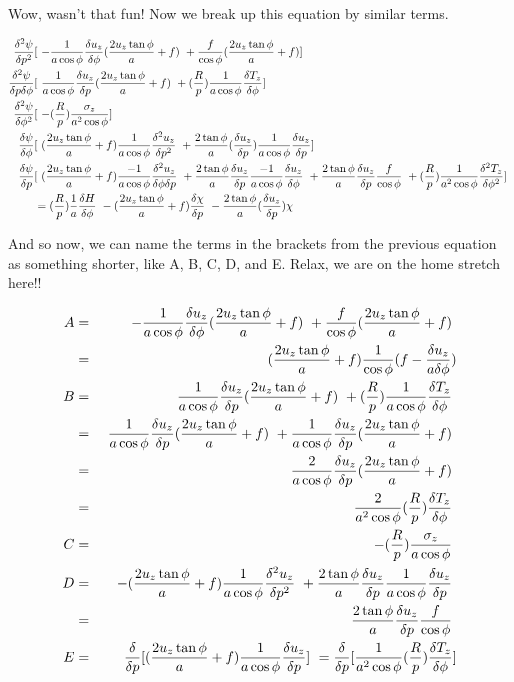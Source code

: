 \documentclass{article}
\begin{document}
Wow, wasn't that fun!  Now we break up this equation by similar terms.

\begin{eqnarray}
\frac{\delta^2 \psi}{\delta p^2} & [ \
- \frac{1}{a\cos{\phi}} \frac{\delta u_z}{\delta \phi} (\frac{2 u_z \tan \phi}{a} + f) \
+ \frac{f}{\cos \phi}(\frac{2 u_z \tan \phi}{a} + f) ] \
\nonumber\\
\frac{\delta^2 \psi}{\delta p \delta \phi} & [ \
\frac{1}{a\cos{\phi}} \frac{\delta u_z}{\delta p}  (\frac{2 u_z \tan \phi }{a} + f) \
+ (\frac{R}{p}) \frac{1}{a\cos{\phi}} \frac{\delta T_z}{\delta \phi} ] \
\nonumber\\
\frac{\delta^2 \psi}{\delta \phi^2} & [ \
- (\frac{R}{p}) \frac{\sigma_z}{a^2 \cos \phi} ] \
\nonumber\\
\frac{\delta \psi}{\delta \phi} & [ \
(\frac{2 u_z \tan \phi}{a} + f) \frac{1}{a\cos{\phi}} \frac{\delta^2 u_z}{\delta p^2} \
+ \frac{2 \tan \phi}{a} (\frac{\delta u_z}{\delta p}) \frac{1}{a\cos{\phi}} \frac{\delta u_z}{\delta p} ] \
\nonumber\\
\frac{\delta \psi}{\delta p} & [ \
(\frac{2 u_z \tan \phi}{a} + f) \frac{-1}{a \cos \phi} \frac{\delta^2 u_z}{\delta \phi \delta p} \
+ \frac{2 \tan \phi}{a} \frac{\delta u_z}{\delta p} \frac{-1}{a \cos \phi} \frac{\delta u_z}{\delta \phi} \
+ \frac{2 \tan \phi}{a} \frac{\delta u_z}{\delta p} \frac{f}{\cos \phi} \
+ (\frac{R}{p}) \frac{1}{a^2 \cos{\phi}} \frac{\delta^2 T_z}{\delta \phi^2} ] \
\nonumber\\
& = (\frac{R}{p}) \frac{1}{a} \frac{\delta H}{\delta \phi} \
- (\frac{2 u_z \tan \phi}{a} + f) \frac{\delta \chi}{\delta p} \
- \frac{2 \tan \phi}{a} (\frac{\delta u_z}{\delta p}) \chi 
\end{eqnarray}

And so now, we can name the terms in the brackets from the previous equation
as something shorter, 
like A, B, C, D, and E.  Relax, we are on the home stretch here!!

\begin{eqnarray}
A & = & \
- \frac{1}{a\cos{\phi}} \frac{\delta u_z}{\delta \phi} (\frac{2 u_z \tan \phi}{a} + f) \
+ \frac{f}{\cos \phi}(\frac{2 u_z \tan \phi}{a} + f) \
\nonumber\\
& = &(\frac{2 u_z \tan \phi}{a} + f) \frac{1}{\cos \phi} (f - \frac{\delta u_z}{a \delta \phi})
\\
B & = & \
\frac{1}{a\cos{\phi}} \frac{\delta u_z}{\delta p}  (\frac{2 u_z \tan \phi }{a} + f) \
+ (\frac{R}{p}) \frac{1}{a\cos{\phi}} \frac{\delta T_z}{\delta \phi} \
\nonumber\\
& = & \
\frac{1}{a\cos{\phi}} \frac{\delta u_z}{\delta p} (\frac{2 u_z \tan \phi }{a} + f) \
+ \frac{1}{a\cos{\phi}} \frac{\delta u_z}{\delta p} (\frac{2 u_z \tan \phi }{a} + f) \
\nonumber\\
& = &\
\frac{2}{a \cos \phi} \frac{\delta u_z}{\delta p} (\frac{2 u_z \tan \phi }{a} + f) \
\nonumber\\
& = &\
\frac{2}{a^2 \cos \phi} (\frac{R}{p}) \frac{\delta T_z}{\delta \phi} \
\\
C & = & - (\frac{R}{p}) \frac{\sigma_z}{a \cos \phi} \
\\
D & = & \
- (\frac{2 u_z \tan \phi}{a} + f) \frac{1}{a\cos{\phi}} \frac{\delta^2 u_z}{\delta p^2} \
+ \frac{2 \tan \phi}{a} \frac{\delta u_z}{\delta p} \frac{1}{a\cos{\phi}} \frac{\delta u_z}{\delta p} \
\nonumber\\
& = &\frac{2 \tan \phi}{a} \frac{\delta u_z}{\delta p} \frac{f}{\cos \phi} \
\\
E & = & \frac{\delta}{\delta p} [ (\frac{2 u_z \tan \phi}{a} + f) \frac{1}{a \cos \phi} \frac{\delta u_z}{\delta p} ] \
= \frac{\delta}{\delta p} [ \frac{1}{a^2 \cos{\phi}} (\frac{R}{p}) \frac{\delta T_z}{\delta \phi} ]
\end{eqnarray}
\end{document}
